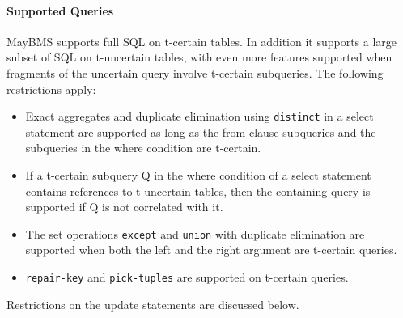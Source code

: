 \paragraph{Supported Queries}
MayBMS supports full SQL on t-certain tables. In addition it supports a large subset of SQL on t-uncertain tables, with even more features supported when fragments of the uncertain query involve t-certain subqueries. The following restrictions apply:
\begin{itemize}
    \item
    Exact aggregates and duplicate elimination using {\tt distinct} in a select statement are supported as long as the from clause subqueries and the subqueries in the where condition are t-certain.
    \item
    If a t-certain subquery Q in the where condition of a select statement contains references to t-uncertain tables, then the containing query is supported if Q is not correlated with it.
    \item
    The set operations {\tt except} and {\tt union} with duplicate elimination are supported when both the left and the right argument are t-certain queries.
    \item
    {\tt repair-key} and {\tt pick-tuples} are supported on t-certain queries.
\end{itemize}

Restrictions on the update statements are discussed below.

